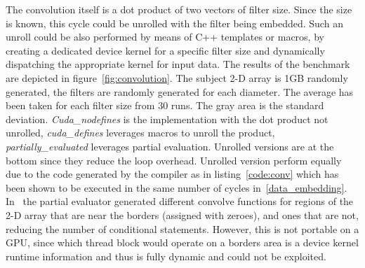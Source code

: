 The convolution itself is a dot product of two vectors of filter size.
Since the size is known, this cycle could be unrolled with the filter being
embedded. %
Such an unroll could be also performed by means of C++ templates or macros, by creating a dedicated device kernel for a specific filter size and dynamically dispatching the appropriate kernel for input data. The results of the benchmark are depicted in figure~\ref{fig:convolution}. The subject 2-D array is 1GB randomly generated, the filters are randomly generated for each diameter. The average has been taken for each filter size from 30 runs. The gray area is the standard deviation. \emph{Cuda\_nodefines} is the implementation with the dot product not unrolled, \emph{cuda\_defines} leverages macros to unroll the product, \emph{partially\_evaluated} leverages partial evaluation. Unrolled versions are at the bottom since they reduce the loop overhead. Unrolled version perform equally due to the code generated by the compiler as in listing~\ref{code:conv} which has been shown to be executed in the same number of cycles in~\ref{data_embedding}.
In~\cite{OnlinePe} the partial evaluator generated different convolve functions for regions of the 2-D array that are near the borders (assigned with zeroes), and ones that are not, reducing the number of conditional statements. However, this is not portable on a GPU, since which thread block would operate on a borders area is a device kernel runtime information and thus is fully dynamic and could not be exploited.



